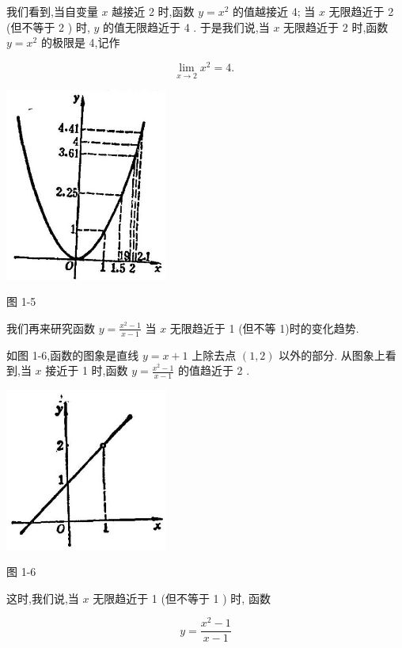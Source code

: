 \documentclass[lang=cn,newtx,10pt,scheme=chinese]{elegantbook}
\begin{document}
我们看到,当自变量 \(x\) 越接近 2 时,函数 \(y = {x}^{2}\) 的值越接近 4; 当 \(x\) 无限趋近于 2 (但不等于 2 ) 时, \(y\) 的值无限趋近于 4 . 于是我们说,当 \(x\) 无限趋近于 2 时,函数 \(y = {x}^{2}\) 的极限是 4,记作

\[
\mathop{\lim }\limits_{{x \rightarrow 2}}{x}^{2} = 4\text{. }
\]

\begin{center}
	\includegraphics[max width=0.4\textwidth]{images/01912c18-5c3f-733d-b775-749ba9897a9d_23_174405.jpg}
\end{center}

图 1-5

我们再来研究函数 \(y = \frac{{x}^{2} - 1}{x - 1}\) 当 \(x\) 无限趋近于 1 (但不等 1)时的变化趋势.

如图 1-6,函数的图象是直线 \(y = x + 1\) 上除去点 \(\left( {1,2}\right)\) 以外的部分. 从图象上看到,当 \(x\) 接近于 1 时,函数 \(y = \frac{{x}^{2} - 1}{x - 1}\) 的值趋近于 2 .

\begin{center}
	\includegraphics[max width=0.4\textwidth]{images/01912c18-5c3f-733d-b775-749ba9897a9d_24_728399.jpg}
\end{center}

图 1-6

这时,我们说,当 \(x\) 无限趋近于 1 (但不等于 1 ) 时, 函数

\[
y = \frac{{x}^{2} - 1}{x - 1}
\]
\end{document}
